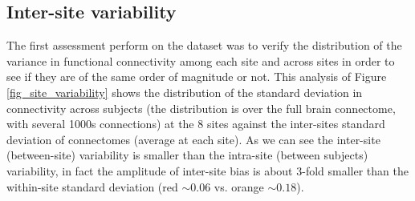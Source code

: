 \documentclass[authoryear]{elsarticle}
\begin{document}
% 

\subsection{Inter-site variability}
The first assessment perform on the dataset was to verify the distribution of the variance in functional connectivity among each site and across sites in order to see if they are of the same order of magnitude or not. This analysis of Figure \ref{fig_site_variability} shows the distribution of the standard deviation in connectivity across subjects (the distribution is over the full brain connectome, with several 1000s connections) at the 8 sites against the inter-sites standard deviation of connectomes (average at each site). As we can see the inter-site (between-site) variability is smaller than the intra-site (between subjects) variability, in fact the amplitude of inter-site bias is about 3-fold smaller than the within-site standard deviation (red $\sim 0.06$ vs. orange $\sim 0.18$).
\end{document}
